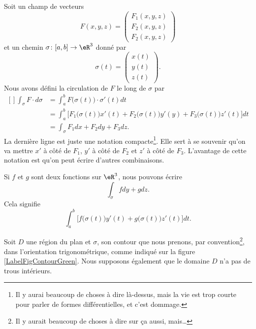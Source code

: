 Soit un champ de vecteurs
\begin{equation}
    F(x,y,z)=\begin{pmatrix}
        F_1(x,y,z)    \\ 
        F_2(x,y,z)    \\ 
        F_2(x,y,z)    
    \end{pmatrix}
\end{equation}
et un chemin $\sigma\colon \mathopen[ a , b \mathclose]\to \eR^3$ donné par
\begin{equation}
    \sigma(t)=\begin{pmatrix}
        x(t)    \\ 
        y(t)    \\ 
        z(t)    
    \end{pmatrix}.
\end{equation}
Nous avons défini la circulation de $F$ le long de $\sigma$ par
\begin{equation}
    \begin{aligned}[]
        \int_{\sigma}F\cdot d\sigma&=\int_a^bF\big( \sigma(t) \big)\cdot\sigma'(t)dt\\
        &=\int_a^b\Big[ F_1\big( \sigma(t) \big)x'(t)+F_2\big( \sigma(t) \big)y'(y)+F_3\big( \sigma(t) \big)z'(t)\Big]dt\\
        &=\int_{\sigma} F_1dx +F_2dy+F_3dz.
    \end{aligned}
\end{equation}
La dernière ligne est juste une notation compacte\footnote{Il y aurai beaucoup de choses à dire là-dessus, mais la vie est trop courte pour parler de formes différentielles, et c'est dommage.}. Elle sert à se souvenir qu'on va mettre $x'$ à côté de $F_1$, $y'$ à côté de $F_2$ et $z'$ à côté de $F_3$. L'avantage de cette notation est qu'on peut écrire d'autres combinaisons.

Si $f$ et $g$ sont deux fonctions sur $\eR^3$, nous pouvons écrire
\begin{equation}
    \int_{\sigma} fdy+gdz.
\end{equation}
Cela signifie
\begin{equation}
    \int_a^b \Big[ f\big( \sigma(t) \big)y'(t)+g\big( \sigma(t) \big)z'(t)\Big]dt.
\end{equation}

Soit $D$ une région du plan et $\sigma$, son contour que nous prenons, par convention\footnote{Il y aurait beaucoup de choses à dire sur ça aussi, mais\ldots}, dans l'orientation trigonométrique, comme indiqué sur la figure \ref{LabelFigContourGreen}. Nous supposons également que le domaine $D$ n'a pas de trous intérieurs.
\newcommand{\CaptionFigContourGreen}{Un contour avec son orientation.}


